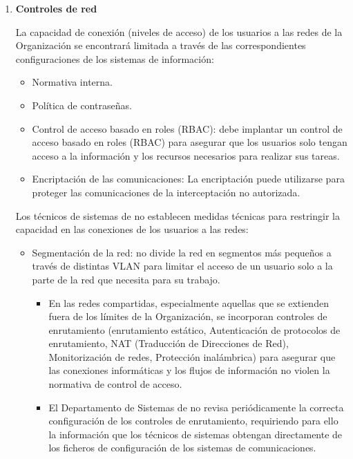 \begin{enumerate}[label=\alph*)]

\item \textbf{Controles de red}

La capacidad de conexión (niveles de acceso) de los usuarios a las redes de la Organización se encontrará limitada a través de las correspondientes configuraciones de los sistemas de información:

\begin{itemize}
    \item Normativa interna.
    \item Política de contraseñas.
    \item Control de acceso basado en roles (RBAC): \Beneficiario{} debe implantar un control de acceso basado en roles (RBAC) para asegurar que los usuarios solo tengan acceso a la información y los recursos necesarios para realizar sus tareas.
    \item Encriptación de las comunicaciones: La encriptación puede utilizarse para proteger las comunicaciones de la interceptación no autorizada.
\end{itemize}

Los técnicos de sistemas de \Beneficiario{} no establecen medidas técnicas para restringir la capacidad en las conexiones de los usuarios a las redes:

\begin{itemize}
    \item Segmentación de la red: \Beneficiario{} no divide la red en segmentos más pequeños a través de distintas VLAN para limitar el acceso de un usuario solo a la parte de la red que necesita para su trabajo.
    \begin{itemize}
        \item En las redes compartidas, especialmente aquellas que se extienden fuera de los límites de la Organización, se incorporan controles de enrutamiento (enrutamiento estático, Autenticación de protocolos de enrutamiento, NAT (Traducción de Direcciones de Red), Monitorización de redes, Protección inalámbrica) para asegurar que las conexiones informáticas y los flujos de información no violen la normativa de control de acceso.
        \item El Departamento de Sistemas de \Beneficiario{} no revisa periódicamente la correcta configuración de los controles de enrutamiento, requiriendo para ello la información que los técnicos de sistemas obtengan directamente de los ficheros de configuración de los sistemas de comunicaciones.
    \end{itemize}
\end{itemize}


\end{enumerate}
